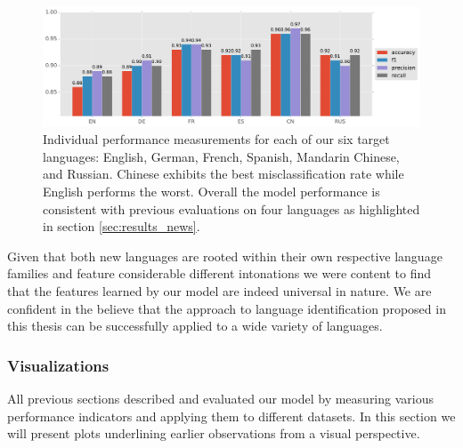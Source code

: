 	\begin{figure}[]
  		\centering
    	\includegraphics[width=\textwidth, keepaspectratio]{plots/results_6lang_plot.pdf}
    	\caption{Individual performance measurements for each of our six target languages: English, German, French, Spanish, Mandarin Chinese, and Russian. Chinese exhibits the best misclassification rate while English performs the worst. Overall the model performance is consistent with previous evaluations on four languages as highlighted in section \ref{sec:results_news}.}
    	\label{fig:6lang}
	\end{figure}

Given that both new languages are rooted within their own respective language families and feature considerable different intonations we were content to find that the features learned by our model are indeed universal in nature. We are confident in the believe that the approach to language identification proposed in this thesis can be successfully applied to a wide variety of languages.

\subsubsection{Visualizations} 
\label{sec:visualization}
All previous sections described and evaluated our model by measuring various performance indicators and applying them to different datasets. In this section we will present plots underlining earlier observations from a visual perspective.
	
